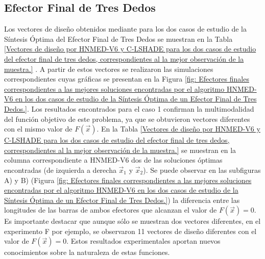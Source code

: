 \subsection{Efector Final de Tres Dedos}
Los vectores de diseño obtenidos mediante para los dos casos
de estudio de la Síntesis Óptima del  Efector Final de Tres Dedos se muestran en la Tabla \ref{Vectores de diseño por HNMED-V6 y C-LSHADE para los dos casos de estudio del efector final de tres dedos, correspondientes al la mejor observación de la muestra.} . A partir de estos vectores se realizaron las simulaciones correspondientes cuyas gráficas se presentan en la Figura \ref{fig: Efectores finales  correspondientes a las mejores soluciones encontradas por el algoritmo HNMED-V6 en los dos casos de estudio de la Síntesis Óptima de un Efector Final de Tres Dedos.}. Los resultados encontrados para el caso 1 confirman la multimodalidad del función objetivo de este problema, ya que se obtuvieron vectores diferentes con el mismo valor de $F(\vec{x})$. En la Tabla \ref{Vectores de diseño por HNMED-V6 y C-LSHADE para los dos casos de estudio del efector final de tres dedos, correspondientes al la mejor observación de la muestra.} se muestran en la columna correspondiente a HNMED-V6 dos de las soluciones óptimas encontradas (de izquierda a derecha $\vec{x}_1$ y $\vec{x}_2$). Se puede observar en las subfiguras A) y B) (Figura \ref{fig: Efectores finales  correspondientes a las mejores soluciones encontradas por el algoritmo HNMED-V6 en los dos casos de estudio de la Síntesis Óptima de un Efector Final de Tres Dedos.}) la diferencia entre las longitudes de las barras de ambos efectores que alcanzan el valor de $F(\vec{x})=0$. Es importante destacar que aunque sólo se muestran dos vectores diferentes, en el experimento F por ejemplo, se observaron 11 vectores de diseño diferentes con el valor de $F(\vec{x})=0$. Estos resultados experimentales aportan nuevos conocimientos sobre la naturaleza de estas funciones.

